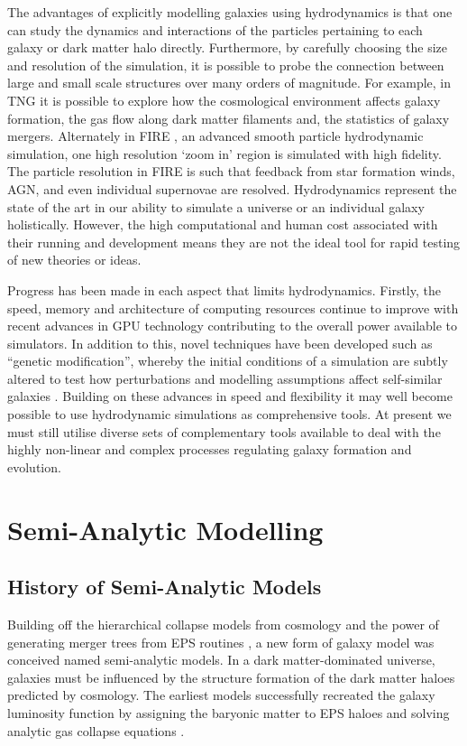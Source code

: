 The advantages of explicitly modelling galaxies using hydrodynamics is that one can study the dynamics and interactions of the particles pertaining to each galaxy or dark matter halo directly. Furthermore, by carefully choosing the size and resolution of the simulation, it is possible to probe the connection between large and small scale structures over many orders of magnitude. For example, in TNG it is possible to explore how the cosmological environment affects galaxy formation, the gas flow along dark matter filaments and, the statistics of galaxy mergers. 
Alternately in FIRE \cite{Hopkins2018FIRE-2Formation}, an advanced smooth particle hydrodynamic simulation, one high resolution `zoom in' region is simulated with high fidelity. The particle resolution in FIRE is such that feedback from star formation winds, AGN, and even individual supernovae are resolved. Hydrodynamics represent the state of the art in our ability to simulate a universe or an individual galaxy holistically. However, the high computational and human cost associated with their running and development means they are not the ideal tool for rapid testing of new theories or ideas. 

Progress has been made in each aspect that limits hydrodynamics. Firstly, the speed, memory and architecture of computing resources continue to improve with recent advances in GPU technology contributing to the overall power available to simulators. In addition to this, novel techniques have been developed such as ``genetic modification'', whereby the initial conditions of a simulation are subtly altered to test how perturbations and modelling assumptions affect self-similar galaxies \citep{Pontzen2017HowGalaxy}. Building on these advances in speed and flexibility it may well become possible to use hydrodynamic simulations as comprehensive tools. At present we must still utilise diverse sets of complementary tools available to deal with the highly non-linear and complex processes regulating galaxy formation and evolution.

\section{Semi-Analytic Modelling}
\label{sec:SAM}
\subsection{History of Semi-Analytic Models}
Building off the hierarchical collapse models from \LCDM cosmology and the power of generating merger trees from EPS routines \citep{Press1974}, a new form of galaxy model was conceived named semi-analytic models. In a dark matter-dominated universe, galaxies must be influenced by the structure formation of the dark matter haloes predicted by \LCDM cosmology. The earliest models successfully recreated the galaxy luminosity function by assigning the baryonic matter to EPS haloes and solving analytic gas collapse equations \citep{White1978CoreClustering}.

